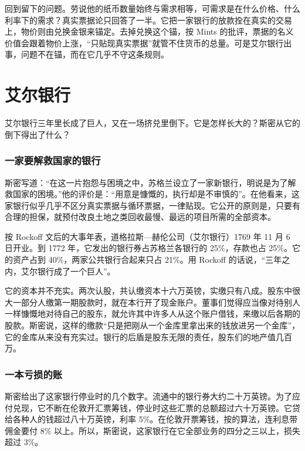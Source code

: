 回到留下的问题。劳说他的纸币数量始终与需求相等，可需求是在什么价格、什么利率下的需求？真实票据论只回答了一半。它把一家银行的放款拴在真实的交易上，物价则由兑换金银来锚定。去掉兑换这个锚，按 Mints 的批评，票据的名义价值会跟着物价上涨，“只贴现真实票据”就管不住货币的总量。可是艾尔银行出事，问题不在锚，而在它几乎不守这条规则。

\section{艾尔银行}\label{sec:smith-ayr}

艾尔银行三年里长成了巨人，又在一场挤兑里倒下。它是怎样长大的？斯密从它的倒下得出了什么？

\subsubsection{一家要解救国家的银行}
斯密写道：“在这一片抱怨与困境之中，苏格兰设立了一家新银行，明说是为了解救国家的困境。”他的评价是：“用意是慷慨的，执行却是不审慎的”\cite{smith1776}。在他看来，这家银行似乎几乎不区分真实票据与循环票据，一律贴现。它公开的原则是，只要有合理的担保，就预付改良土地之类回收最慢、最远的项目所需的全部资本\cite{smith1776}。

按 Rockoff 文后的大事年表，道格拉斯—赫伦公司（艾尔银行）1769 年 11 月 6 日开业。到 1772 年，它发出的银行券占苏格兰各银行的 25\%，存款也占 25\%。它的资产占到 40\%，两家公共银行合起来只占 21\%。用 Rockoff 的话说，“三年之内，艾尔银行成了一个巨人”\cite{rockoff2009}。

它的资本并不充实。两次认股，共认缴资本十六万英镑，实缴只有八成\cite{smith1776}。股东中很大一部分人缴第一期股款时，就在本行开了现金账户。董事们觉得应当像对待别人一样慷慨地对待自己的股东，就允许其中许多人从这个账户借钱，来缴以后各期的股款。斯密说，这样的缴款“只是把刚从一个金库里拿出来的钱放进另一个金库”，它的金库从来没有充实过\cite{smith1776}。银行的后盾是股东无限的责任，股东们的地产值几百万\cite{smith1776}。

\subsubsection{一本亏损的账}
斯密给出了这家银行停业时的几个数字。流通中的银行券大约二十万英镑。为了应付兑现，它不断在伦敦开汇票筹钱，停业时这些汇票的总额超过六十万英镑。它贷给各种人的钱超过八十万英镑，利率 5\%\cite{smith1776}。在伦敦开票筹钱，按的算法，连利息带佣金要付 8\% 以上。所以，斯密说，这家银行在它全部业务的四分之三以上，损失超过 3\%\cite{smith1776}。

